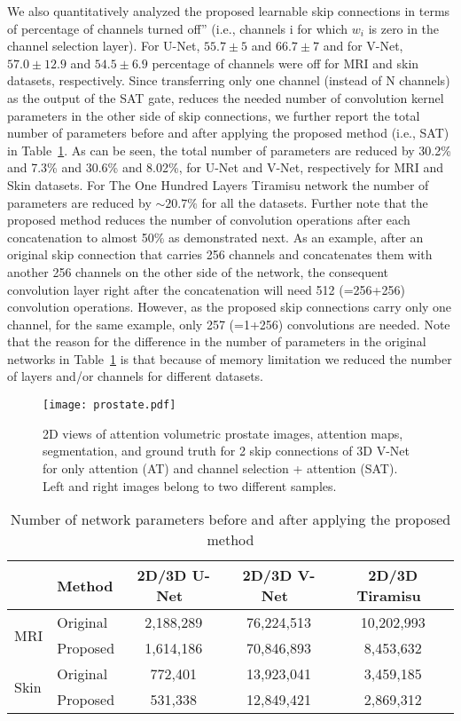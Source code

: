 \documentclass{article}
\begin{document}
We also quantitatively analyzed the proposed learnable skip connections in terms of percentage of channels turned off” (i.e., channels i for which $w_i$ is zero in the channel selection layer). For U-Net, $55.7\pm5$ and $66.7\pm7$ and for V-Net, $57.0\pm12.9$ and $54.5\pm6.9$ percentage of channels were off for MRI and skin datasets, respectively. Since transferring only one channel (instead of N channels) as the output of the SAT gate, reduces the needed number of convolution kernel parameters in the other side of skip connections, we further report the total number of parameters before and after applying the proposed method (i.e., SAT) in Table~\ref{table3}. As can be seen, the total number of parameters are reduced by 30.2\% and 7.3\% and 30.6\% and 8.02\%, for U-Net and V-Net, respectively for MRI and Skin datasets. For The One Hundred Layers Tiramisu network the number of parameters are reduced by $\sim20.7\%$ for all the datasets. Further note that the proposed method reduces the number of convolution operations after each concatenation to almost 50\% as demonstrated next. As an example, after an original skip connection that carries 256 channels and concatenates them with another 256 channels on the other side of the network, the consequent convolution layer right after the concatenation will need 512 (=256+256) convolution operations. However, as the proposed skip connections carry only one channel, for the same example, only 257 (=1+256) convolutions are needed. Note that the reason for the difference in the number of parameters in the original networks in Table~\ref{table3} is that because of memory limitation we reduced the number of layers and/or channels for different datasets.


\begin{figure}
\centering
\texttt{[image: prostate.pdf]}
\caption{2D views of attention volumetric prostate images, attention maps, segmentation, and ground truth for 2 skip connections of 3D V-Net for only attention (AT) and channel selection + attention (SAT). Left and right images belong to two different samples.}
\label{figure7}
\end{figure}

\begin{table}
\small
\setlength{\tabcolsep}{5pt}
\centering
\caption{Number of network parameters before and after applying the proposed method}
\label{table3}
\begin{tabular}{llccc}
\hline
& Method   & 2D/3D U-Net~\cite{ronneberger2015u,cciccek20163d}  & 2D/3D V-Net~\cite{milletari2016v} & 2D/3D Tiramisu~\cite{jegou2017one}       \\ \hline
\multirow{2}{*}{MRI}  & Original  & 2,188,289 & 76,224,513 & 10,202,993\\
                      & Proposed & 1,614,186 & 70,846,893 & 8,453,632 \\ \hline
\multirow{2}{*}{Skin} & Original & 772,401   & 13,923,041  & 3,459,185\\
                      & Proposed & 531,338   & 12,849,421 & 2,869,312\\ \hline
\end{tabular}
\end{table}
\end{document}
